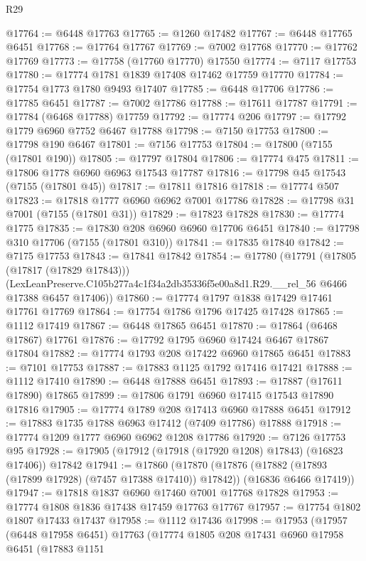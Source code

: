 \begin{lexlean}{R29}
\begin{coremodule}
@17764 := @6448 @17763
@17765 := @1260 @17482
@17767 := @6448 @17765 @6451
@17768 := @17764 @17767
@17769 := @7002 @17768
@17770 := @17762 @17769
@17773 := @17758 (@17760 @17770) @17550
@17774 := @7117 @17753
@17780 := @17774 @1781 @1839 @17408 @17462 @17759 @17770
@17784 := @17754 @1773 @1780 @9493 @17407
@17785 := @6448 @17706
@17786 := @17785 @6451
@17787 := @7002 @17786
@17788 := @17611 @17787
@17791 := @17784 (@6468 @17788) @17759
@17792 := @17774 @206
@17797 := @17792 @1779 @6960 @7752 @6467 @17788
@17798 := @7150 @17753
@17800 := @17798 @190 @6467
@17801 := @7156 @17753
@17804 := @17800 (@7155 (@17801 @190))
@17805 := @17797 @17804
@17806 := @17774 @475
@17811 := @17806 @1778 @6960 @6963 @17543 @17787
@17816 := @17798 @45 @17543 (@7155 (@17801 @45))
@17817 := @17811 @17816
@17818 := @17774 @507
@17823 := @17818 @1777 @6960 @6962 @7001 @17786
@17828 := @17798 @31 @7001 (@7155 (@17801 @31))
@17829 := @17823 @17828
@17830 := @17774 @1775
@17835 := @17830 @208 @6960 @6960 @17706 @6451
@17840 := @17798 @310 @17706 (@7155 (@17801 @310))
@17841 := @17835 @17840
@17842 := @7175 @17753
@17843 := @17841 @17842
@17854 := @17780
    (@17791
      (@17805 (@17817 (@17829 @17843)))
      (LexLeanPreserve.C105b277a4c1f34a2db35336f5e00a8d1.R29.__rel_56 @6466 @17388 @6457 @17406))
@17860 := @17774 @1797 @1838 @17429 @17461 @17761 @17769
@17864 := @17754 @1786 @1796 @17425 @17428
@17865 := @1112 @17419
@17867 := @6448 @17865 @6451
@17870 := @17864 (@6468 @17867) @17761
@17876 := @17792 @1795 @6960 @17424 @6467 @17867 @17804
@17882 := @17774 @1793 @208 @17422 @6960 @17865 @6451
@17883 := @7101 @17753
@17887 := @17883 @1125 @1792 @17416 @17421
@17888 := @1112 @17410
@17890 := @6448 @17888 @6451
@17893 := @17887 (@17611 @17890) @17865
@17899 := @17806 @1791 @6960 @17415 @17543 @17890 @17816
@17905 := @17774 @1789 @208 @17413 @6960 @17888 @6451
@17912 := @17883 @1735 @1788 @6963 @17412 (@7409 @17786) @17888
@17918 := @17774 @1209 @1777 @6960 @6962 @1208 @17786
@17920 := @7126 @17753 @95
@17928 := @17905 (@17912 (@17918 (@17920 @1208) @17843) (@16823 @17406)) @17842
@17941 := @17860
    (@17870
      (@17876 (@17882 (@17893 (@17899 @17928) (@7457 @17388 @17410)) @17842))
      (@16836 @6466 @17419))
@17947 := @17818 @1837 @6960 @17460 @7001 @17768 @17828
@17953 := @17774 @1808 @1836 @17438 @17459 @17763 @17767
@17957 := @17754 @1802 @1807 @17433 @17437
@17958 := @1112 @17436
@17998 := @17953
    (@17957
      (@6448 @17958 @6451)
      @17763
      (@17774
        @1805
        @208
        @17431
        @6960
        @17958
        @6451
        (@17883
          @1151

\end{coremodule}
\end{lexlean}
